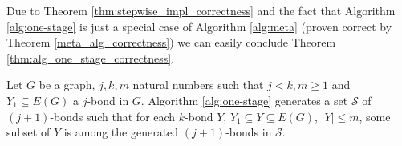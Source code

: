\clearpage

Due to Theorem \ref{thm:stepwise_impl_correctness} and the fact that Algorithm \ref{alg:one-stage} is just a special case of Algorithm \ref{alg:meta} (proven correct by Theorem \ref{meta_alg_correctness}) we can easily conclude Theorem \ref{thm:alg_one_stage_correctness}.

 \begin{thm}
	\label{thm:alg_one_stage_correctness}
	Let $G$ be a graph, $j,k,m$ natural numbers such that $j < k, m \geq 1$ and $Y_1 \subseteq E(G)$ a $j$-bond in $G$. Algorithm \ref{alg:one-stage} generates a set $\mathcal{S}$ of $(j+1)$-bonds such that for each $k$-bond $Y$, $Y_1 \subseteq Y \subseteq E(G)$, $\lvert Y \rvert \leq m$, some subset of $Y$ is among the generated $(j+1)$-bonds in $\mathcal{S}$.
\end{thm}








